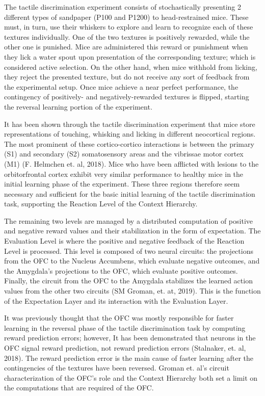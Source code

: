 \documentclass[]{article}
\begin{document}
The tactile discrimination experiment consists of stochastically presenting 2 different types of sandpaper (P100 and P1200) to head-restrained mice.  These must, in turn, use their whiskers to explore and learn to recognize each of these textures individually.  One of the two textures is positively rewarded, while the other one is punished.  Mice are administered this reward or punishment when they lick a water spout upon presentation of the corresponding texture; which is considered active selection.  On the other hand, when mice withhold from licking, they reject the presented texture, but do not receive any sort of feedback from the experimental setup.  Once mice achieve a near perfect performance, the contingency of positively- and negatively-rewarded textures is flipped, starting the reversal learning portion of the experiment.

It has been shown through the tactile discrimination experiment that mice store representations of touching, whisking and licking in different neocortical regions.  The most prominent of these cortico-cortico interactions is between the primary (S1) and secondary (S2) somatosensory areas and the vibrissae motor cortex (M1) (F. Helmchen et. al, 2018).  Mice who have been afflicted with lesions to the orbitorfrontal cortex exhibit very similar performance to healthy mice in the initial learning phase of the experiment.  These three regions therefore seem necessary and sufficient for the basic initial learning of the tactile discrimination task, supporting the Reaction Level of the Context Hierarchy.

The remaining two levels are managed by a distributed computation of positive and negative reward values and their stabilization in the form of expectation.  The Evaluation Level is where the positive and negative feedback of the Reaction Level is processed.  This level is composed of two neural circuits: the projections from the OFC to the Nucleus Accumbens, which evaluate negative outcomes, and the Amygdala's projections to the OFC, which evaluate positive outcomes.  Finally, the circuit from the OFC to the Amygdala stabilizes the learned action values from the other two circuits (SM Groman, et. at, 2019).  This is the function of the Expectation Layer and its interaction with the Evaluation Layer.

It was previously thought that the OFC was mostly responsible for faster learning in the reversal phase of the tactile discrimination task by computing reward prediction errors; however, It has been demonstrated that neurons in the OFC signal reward prediction, not reward prediction errors (Stalnaker, et. al, 2018).  The reward prediction error is the main cause of faster learning after the contingencies of the textures have been reversed.  Groman et. al's circuit characterization of the OFC's role and the Context Hierarchy both set a limit on the computations that are required of the OFC.
\end{document}

